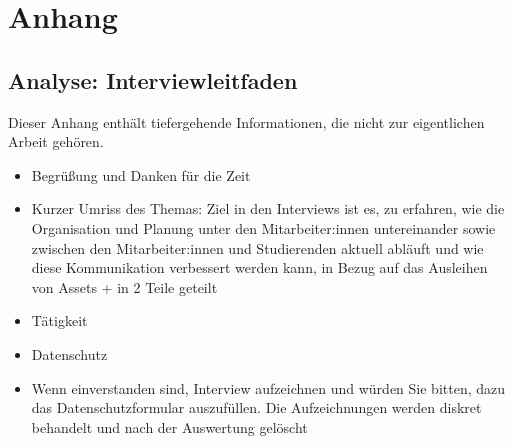
\chapter{Anhang}


\section{Analyse: Interviewleitfaden}
\label{appendix:interview}

Dieser Anhang enthält tiefergehende Informationen, die nicht zur eigentlichen Arbeit gehören.

\begin{itemize}
    \item Begrüßung und Danken für die Zeit
    \item Kurzer Umriss des Themas: Ziel in den Interviews ist es, zu erfahren, wie die Organisation
          und Planung unter den Mitarbeiter:innen untereinander sowie zwischen den Mitarbeiter:innen und
          Studierenden aktuell abläuft und wie diese Kommunikation verbessert werden kann, in Bezug auf
          das Ausleihen von Assets + in 2 Teile geteilt
    \item Tätigkeit
    \item Datenschutz
    \item Wenn einverstanden sind, Interview aufzeichnen und würden Sie bitten, dazu das
          Datenschutzformular auszufüllen. Die Aufzeichnungen werden diskret behandelt und nach der
          Auswertung gelöscht
\end{itemize}

